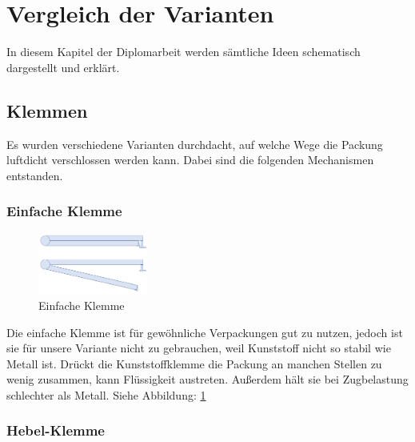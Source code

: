 \section{Vergleich der Varianten}

In diesem Kapitel der Diplomarbeit werden sämtliche Ideen schematisch dargestellt und erklärt.
 
\subsection{Klemmen}

Es wurden verschiedene Varianten durchdacht, auf welche Wege die Packung luftdicht verschlossen werden kann. Dabei sind die folgenden Mechanismen entstanden.

\subsubsection{Einfache Klemme}

\begin{figure}
\vspace{-20pt}
  \begin{center}
    \includegraphics[width=0.32\textwidth]{Bilder/Powerpoint/Einfach_Klemme}
  \end{center}
  \caption{Einfache Klemme}
  \label{Einfache Klemme}
  \vspace{-10pt}
\end{figure}

Die einfache Klemme ist für gewöhnliche Verpackungen gut zu nutzen, jedoch ist sie für unsere Variante nicht zu gebrauchen, weil Kunststoff nicht so stabil wie Metall ist. Drückt die Kunststoffklemme die Packung an manchen Stellen zu wenig zusammen, kann Flüssigkeit austreten. Außerdem hält sie bei Zugbelastung schlechter als Metall. Siehe Abbildung: \ref{Einfache Klemme}

\subsubsection{Hebel-Klemme} 

